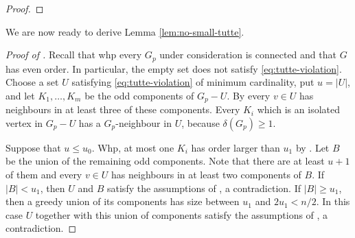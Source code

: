 \documentclass[notitlepage]{scrartcl}
\newcommand{\cP}{\mathcal{P}}
\begin{document}
\begin{proof}
\end{proof}

We are now ready to derive Lemma \ref{lem:no-small-tutte}.
\begin{proof}[Proof of ]
Recall that whp every $G_p$ under consideration is connected and that $G$ has even order. In particular, the empty set does not satisfy \eqref{eq:tutte-violation}.
Choose a set $U$ satisfying \eqref{eq:tutte-violation} of minimum cardinality, put $u=|U|$, and let $K_1,\ldots,K_m$ be the odd components of $G_p-U$.
By  every $v\in U$ has neighbours in at least three of these components. 
Every $K_i$ which is an isolated vertex in $G_p-U$ has a $G_p$-neighbour in $U$, because $\delta(G_p)\ge1$.

Suppose that $u \leq u_0$.  
Whp, at most one $K_i$ has order larger than $u_1$ by . Let $B$ be the union of the remaining odd components. Note that there are at least $u+1$ of them and every $v\in U$ has neighbours in at least two components of $B$.
If $|B| < u_1$, then $U$ and $B$ satisfy the assumptions of , a contradiction.
If $|B|\geq u_1$, then a greedy union of its components has size between $u_1$ and $2u_1<n/2$. In this case $U$ together with this union of components satisfy the assumptions of , a contradiction.
\end{proof}
\end{document}
